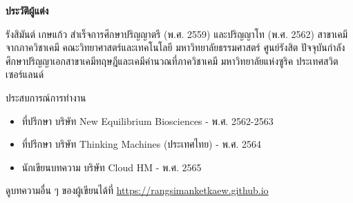 

{
\thispagestyle{empty}

\begin{center}
    \LARGE\textbf{ประวัติผู้แต่ง}
\end{center}

รังสิมันต์ เกษแก้ว สำเร็จการศึกษาปริญญาตรี (พ.ศ. 2559) และปริญญาโท (พ.ศ. 2562) สาขาเคมี จากภาควิชาเคมี 
คณะวิทยาศาสตร์และเทคโนโลยี มหาวิทยาลัยธรรมศาสตร์ ศูนย์รังสิต ปัจจุบันกำลังศึกษาปริญญาเอกสาขาเคมีทฤษฎีและเคมีคำนวณที่ภาควิชาเคมี 
มหาวิทยาลัยแห่งซูริค ประเทศสวิตเซอร์แลนด์

\noindent ประสบการณ์การทำงาน
\begin{itemize}
    \item ที่ปรึกษา บริษัท New Equilibrium Biosciences - พ.ศ. 2562-2563
    \item ที่ปรึกษา บริษัท Thinking Machines (ประเทศไทย) - พ.ศ. 2564
    \item นักเขียนบทความ บริษัท Cloud HM - พ.ศ. 2565
\end{itemize}

\noindent ดูบทความอื่น ๆ ของผู้เขียนได้ที่ \url{https://rangsimanketkaew.github.io}

\vfill
}

